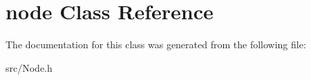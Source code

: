 \hypertarget{classnode}{\section{node Class Reference}
\label{classnode}
}


The documentation for this class was generated from the following file\+:\begin{DoxyCompactItemize}
\item 
src/Node.\+h\end{DoxyCompactItemize}

